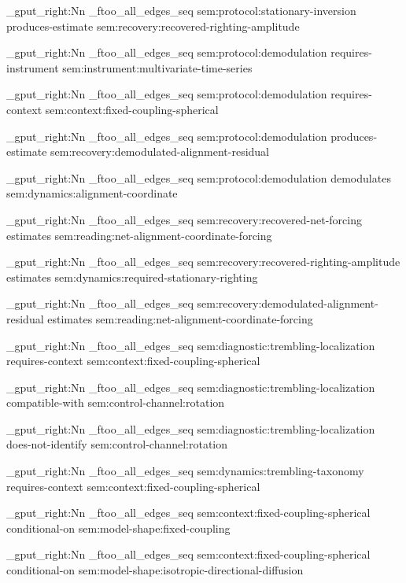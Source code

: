 \seq_gput_right:Nn \g_ftoo_all_edges_seq { { sem:protocol:stationary-inversion } { produces-estimate } { sem:recovery:recovered-righting-amplitude } }

\seq_gput_right:Nn \g_ftoo_all_edges_seq { { sem:protocol:demodulation } { requires-instrument } { sem:instrument:multivariate-time-series } }

\seq_gput_right:Nn \g_ftoo_all_edges_seq { { sem:protocol:demodulation } { requires-context } { sem:context:fixed-coupling-spherical } }

\seq_gput_right:Nn \g_ftoo_all_edges_seq { { sem:protocol:demodulation } { produces-estimate } { sem:recovery:demodulated-alignment-residual } }

\seq_gput_right:Nn \g_ftoo_all_edges_seq { { sem:protocol:demodulation } { demodulates } { sem:dynamics:alignment-coordinate } }

\seq_gput_right:Nn \g_ftoo_all_edges_seq { { sem:recovery:recovered-net-forcing } { estimates } { sem:reading:net-alignment-coordinate-forcing } }

\seq_gput_right:Nn \g_ftoo_all_edges_seq { { sem:recovery:recovered-righting-amplitude } { estimates } { sem:dynamics:required-stationary-righting } }

\seq_gput_right:Nn \g_ftoo_all_edges_seq { { sem:recovery:demodulated-alignment-residual } { estimates } { sem:reading:net-alignment-coordinate-forcing } }

\seq_gput_right:Nn \g_ftoo_all_edges_seq { { sem:diagnostic:trembling-localization } { requires-context } { sem:context:fixed-coupling-spherical } }

\seq_gput_right:Nn \g_ftoo_all_edges_seq { { sem:diagnostic:trembling-localization } { compatible-with } { sem:control-channel:rotation } }

\seq_gput_right:Nn \g_ftoo_all_edges_seq { { sem:diagnostic:trembling-localization } { does-not-identify } { sem:control-channel:rotation } }

\seq_gput_right:Nn \g_ftoo_all_edges_seq { { sem:dynamics:trembling-taxonomy } { requires-context } { sem:context:fixed-coupling-spherical } }

\seq_gput_right:Nn \g_ftoo_all_edges_seq { { sem:context:fixed-coupling-spherical } { conditional-on } { sem:model-shape:fixed-coupling } }

\seq_gput_right:Nn \g_ftoo_all_edges_seq { { sem:context:fixed-coupling-spherical } { conditional-on } { sem:model-shape:isotropic-directional-diffusion } }

